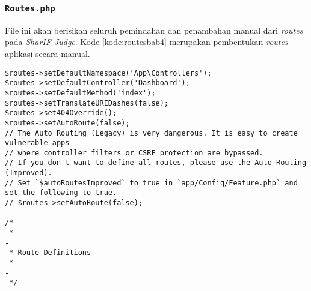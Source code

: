 \subsubsection{\texttt{Routes.php}}
File ini akan berisikan seluruh pemindahan dan penambahan manual dari \textit{routes} pada \textit{SharIF Judge}. Kode \ref{kode:routesbab4} merupakan pembentukan \textit{routes} aplikasi secara manual.
\begin{lstlisting}[caption=Penambahan \textit{routes} yang digunakan pada aplikasi \textit{SharIF Judge}, label=kode:routesbab4]
	$routes->setDefaultNamespace('App\Controllers');
$routes->setDefaultController('Dashboard');
$routes->setDefaultMethod('index');
$routes->setTranslateURIDashes(false);
$routes->set404Override();
$routes->setAutoRoute(false);
// The Auto Routing (Legacy) is very dangerous. It is easy to create vulnerable apps
// where controller filters or CSRF protection are bypassed.
// If you don't want to define all routes, please use the Auto Routing (Improved).
// Set `$autoRoutesImproved` to true in `app/Config/Feature.php` and set the following to true.
// $routes->setAutoRoute(false);

/*
 * --------------------------------------------------------------------
 * Route Definitions
 * --------------------------------------------------------------------
 */


\end{lstlisting}
